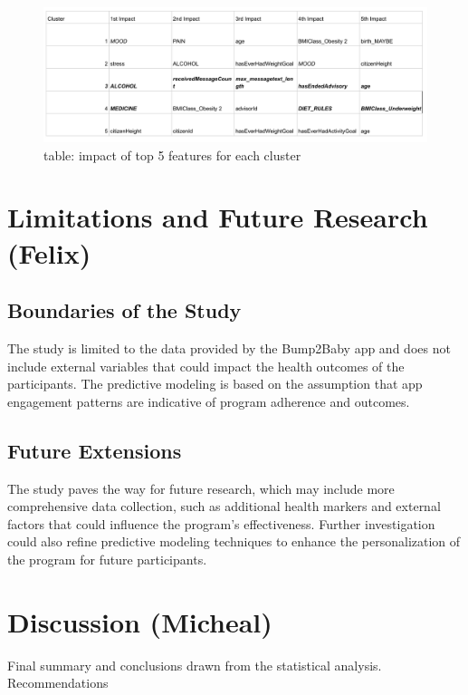 \documentclass[12pt]{article}
\begin{document}
\begin{figure}[h]
  \centering
  \includegraphics[width=0.7\linewidth]{images/table.png}
  \caption{table: impact of top 5 features for each cluster}
  \label{fig:table}
  \end{figure}



\section{Limitations and Future Research (Felix)}

\label{s.limit}

\subsection{Boundaries of the Study}
The study is limited to the data provided by the Bump2Baby app and does not include external variables that could impact the health outcomes of the participants. The predictive modeling is based on the assumption that app engagement patterns are indicative of program adherence and outcomes.

\subsection{Future Extensions}
The study paves the way for future research, which may include more comprehensive data collection, such as additional health markers and external factors that could influence the program's effectiveness. Further investigation could also refine predictive modeling techniques to enhance the personalization of the program for future participants.


\section{Discussion (Micheal)}

\label{s.discuss}

Final summary and conclusions drawn from the statistical analysis.
Recommendations


\newpage
%
%

\setlength{\bibhang}{0pt}

\raggedright

\end{document}
